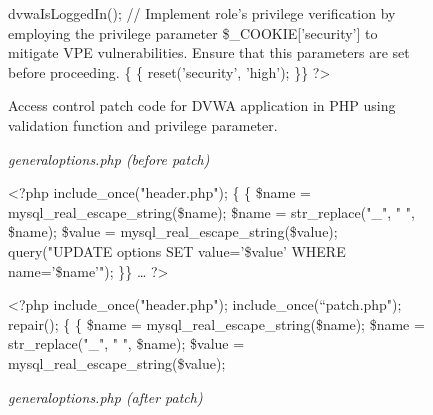 \documentclass[10pt,journal,compsoc]{IEEEtran}
\begin{document}
\begin{CJK}{UTF8}{gbsn}
\begin{figure*}[ht]
\begin{minipage}[t]{1\textwidth}
\begin{algorithm}[H]
\begin{algorithmic}[1]
\State dvwaIsLoggedIn();
 \Statex \textcolor[rgb]{0.16,0.32,0.66}{// Implement role's privilege verification by employing the privilege parameter \$\_COOKIE['security'] to mitigate VPE vulnerabilities. Ensure that this parameters are set before proceeding.}
\{ 
    \{
        \State reset('security', 'high');
    \EndIf
\EndIf
\State \}\}
\State?\textgreater 
\end{algorithmic}
\end{algorithm}
\end{minipage}%
\caption{Access control patch code for DVWA application in PHP using validation function and privilege parameter.}
\label{DVWA}
\end{figure*}

\begin{figure*}[ht]
\begin{minipage}[t]{0.48\textwidth}
\begin{algorithm}[H]
\small
\renewcommand{\thealgorithm}{}
\caption{\textit{generaloptions.php (before patch)}}
\begin{algorithmic}[1]
\State \textless?php include\_once("header.php");
 \{
     \{
        \State \$name = mysql\_real\_escape\_string(\$name);
        \State \$name = str\_replace("\_", " ", \$name);
        \State \$value = mysql\_real\_escape\_string(\$value);
        \State query("UPDATE options SET value='\$value' WHERE name='\$name'");
    \EndFor
\EndIf
\State \}\}
\State …
\State ?\textgreater 
\end{algorithmic}
\end{algorithm}
\end{minipage}
\hfill
\begin{minipage}[t]{0.48\textwidth}
\begin{algorithm}[H]
\small
\renewcommand{\thealgorithm}{}
\caption{\textit{generaloptions.php (after patch)}}
\begin{algorithmic}[1]
\State \textless?php include\_once("header.php");
\State \textcolor[rgb]{0.16,0.32,0.66}{include\_once(“patch.php");}
\State \textcolor[rgb]{0.16,0.32,0.66}{repair();}
 \{
     \{
        \State \$name = mysql\_real\_escape\_string(\$name);
        \State \$name = str\_replace("\_", " ", \$name);
        \State \$value = mysql\_real\_escape\_string(\$value);

\end{algorithmic}
\end{algorithm}
\end{minipage}
\end{figure*}
\end{CJK}
\end{document}
